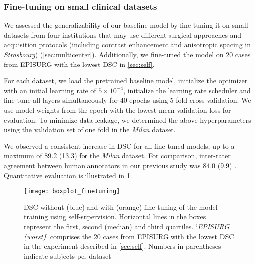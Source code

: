 \subsubsection{Fine-tuning on small clinical datasets}

We assessed the generalizability of our baseline model by fine-tuning it on small datasets from four institutions that may use different surgical approaches and acquisition protocols (including contrast enhancement and anisotropic spacing in \textit{Strasbourg}) (\cref{sec:multicenter}).
Additionally, we fine-tuned the model on 20 cases from EPISURG with the lowest \ac{DSC} in \cref{sec:self}.

For each dataset, we load the pretrained baseline model, initialize the optimizer with an initial learning rate of $5 \times 10^{-4}$, initialize the learning rate scheduler and fine-tune all layers simultaneously for 40 epochs using 5-fold cross-validation.
We use model weights from the epoch with the lowest mean validation loss for evaluation.
To minimize data leakage, we determined the above hyperparameters using the validation set of one fold in the \textit{Milan} dataset.

We observed a consistent increase in \ac{DSC} for all fine-tuned models, up to a maximum of 89.2 (13.3) for the \textit{Milan} dataset.
For comparison, inter-rater agreement between human annotators in our previous study was 84.0 (9.9) \cite{perez-garcia_simulation_2020}.
Quantitative evaluation is illustrated in \cref{fig:finetuning_quant}.


\begin{figure}
  \centering
  \texttt{[image: boxplot\_finetuning]}
  \caption{
    \ac{DSC} without (blue) and with (orange) fine-tuning of the model training using self-supervision.
    Horizontal lines in the boxes represent the first, second (median) and third quartiles.
    `\textit{EPISURG (worst)}' comprises the 20 cases from EPISURG with the lowest \ac{DSC} in the experiment described in \cref{sec:self}.
    Numbers in parentheses indicate subjects per dataset
  }
  \label{fig:finetuning_quant}
\end{figure}

